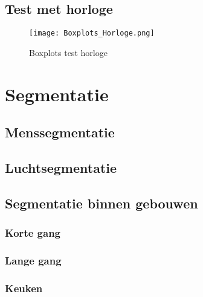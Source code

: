 \subsection{Test met horloge}
\begin{figure}[H]
	\centering
	\texttt{[image: Boxplots\_Horloge.png]}
	\caption{Boxplots test horloge}
\end{figure}

\section{Segmentatie}

\subsection{Menssegmentatie}

\subsection{Luchtsegmentatie}

\subsection{Segmentatie binnen gebouwen}

\subsubsection{Korte gang}

\subsubsection{Lange gang}

\subsubsection{Keuken}


